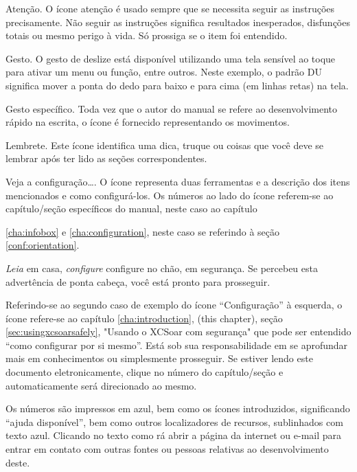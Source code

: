 \warning Atenção.  O ícone atenção é usado sempre que se necessita seguir as instruções precisamente.   Não seguir as instruções significa resultados inesperados, disfunções totais ou mesmo perigo à vida.  Só prossiga se o item foi entendido.

 Gesto.  O gesto de deslize está disponível utilizando uma tela sensível ao toque para ativar um menu ou função, entre outros.  Neste exemplo, o padrão DU significa mover a ponta do dedo para baixo e para cima (em linhas retas) na tela.
  
 Gesto específico.  Toda vez que o autor do manual se refere ao desenvolvimento rápido na escrita, o ícone é fornecido representando os movimentos.

\tip Lembrete. Este ícone identifica uma dica, truque ou coisas que você deve se lembrar após ter lido as seções correspondentes.

 Veja a configuração…. O ícone representa duas ferramentas e a descrição dos itens mencionados e como configurá-los.  Os números ao lado do ícone referem-se ao capítulo/seção específicos do manual, neste caso ao capítulo 

 \ref{cha:infobox} e 
\ref{cha:configuration}, neste caso se referindo à seção 
\ref{conf:orientation}. 


\emph{Leia} em casa, \emph{configure} configure no chão, em segurança.  Se percebeu esta advertência de ponta cabeça, você está pronto para prosseguir.

 Referindo-se ao segundo caso de exemplo do ícone “Configuração” à esquerda, o ícone refere-se ao capítulo \ref{cha:introduction}, (this chapter), seção 
\ref{sec:usingxcsoarsafely}, "Usando o XCSoar com segurança" que pode ser entendido “como configurar por si mesmo”.  Está sob sua responsabilidade em se aprofundar mais em conhecimentos ou simplesmente prosseguir.  Se estiver lendo este documento eletronicamente, clique no número do capítulo/seção e automaticamente será direcionado ao mesmo.  

Os números são impressos em azul, bem como os ícones introduzidos, significando “ajuda disponível”, bem como outros localizadores de recursos, sublinhados com texto azul. Clicando no texto como   rá abrir a página da internet ou e-mail para entrar em contato com outras fontes ou pessoas relativas ao desenvolvimento deste.

